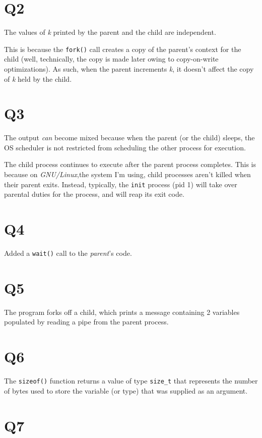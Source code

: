 \documentclass[runningheads,a4paper]{report}
\begin{document}
\section*{Q2}

The values of \textit{k} printed by the parent and the child are independent.

This is because the \texttt{fork()} call creates a copy of the parent's context for the child (well, technically, the copy is made later owing to copy-on-write optimizations). As such, when the parent increments \textit{k}, it doesn't affect the copy of \textit{k} held by the child.

\section*{Q3}

The output \textit{can} become mixed because when the parent (or the child) sleeps, the OS scheduler is not restricted from scheduling the other process for execution.

The child process continues to execute after the parent process completes. This is because on \textit{GNU/Linux},the system I'm using, child processes aren't killed when their parent exits. Instead, typically, the \texttt{init} process (pid 1) will take over parental duties for the process, and will reap its exit code.

\section*{Q4}

Added a \texttt{wait()} call to the \textit{parent}'s code.

\lstset{caption=git-diff of changes}


\section*{Q5}

The program forks off a child, which prints a message containing 2 variables populated by reading a pipe from the parent process.

\section*{Q6}

The \texttt{sizeof()} function returns a value of type \texttt{size\_t} that represents the number of bytes used to store the variable (or type) that was supplied as an argument.

\section*{Q7}

\lstset{caption=Using parent and a child to count the primes among randomly generated numbers, language=C}

\end{document}
